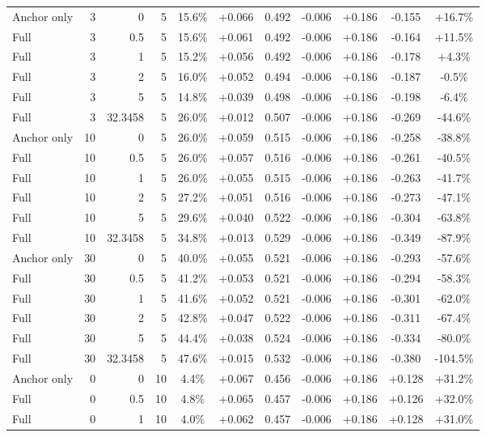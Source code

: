 \begin{table}[htbp]
\begin{tabular}{lrrrccccccc}
Anchor only & 3 & 0 & 5 & 15.6\% & +0.066 & 0.492 & -0.006 & +0.186 & -0.155 & +16.7\% \\
Full & 3 & 0.5 & 5 & 15.6\% & +0.061 & 0.492 & -0.006 & +0.186 & -0.164 & +11.5\% \\
Full & 3 & 1 & 5 & 15.2\% & +0.056 & 0.492 & -0.006 & +0.186 & -0.178 & +4.3\% \\
Full & 3 & 2 & 5 & 16.0\% & +0.052 & 0.494 & -0.006 & +0.186 & -0.187 & -0.5\% \\
Full & 3 & 5 & 5 & 14.8\% & +0.039 & 0.498 & -0.006 & +0.186 & -0.198 & -6.4\% \\
Full & 3 & 32.3458 & 5 & 26.0\% & +0.012 & 0.507 & -0.006 & +0.186 & -0.269 & -44.6\% \\
Anchor only & 10 & 0 & 5 & 26.0\% & +0.059 & 0.515 & -0.006 & +0.186 & -0.258 & -38.8\% \\
Full & 10 & 0.5 & 5 & 26.0\% & +0.057 & 0.516 & -0.006 & +0.186 & -0.261 & -40.5\% \\
Full & 10 & 1 & 5 & 26.0\% & +0.055 & 0.515 & -0.006 & +0.186 & -0.263 & -41.7\% \\
Full & 10 & 2 & 5 & 27.2\% & +0.051 & 0.516 & -0.006 & +0.186 & -0.273 & -47.1\% \\
Full & 10 & 5 & 5 & 29.6\% & +0.040 & 0.522 & -0.006 & +0.186 & -0.304 & -63.8\% \\
Full & 10 & 32.3458 & 5 & 34.8\% & +0.013 & 0.529 & -0.006 & +0.186 & -0.349 & -87.9\% \\
Anchor only & 30 & 0 & 5 & 40.0\% & +0.055 & 0.521 & -0.006 & +0.186 & -0.293 & -57.6\% \\
Full & 30 & 0.5 & 5 & 41.2\% & +0.053 & 0.521 & -0.006 & +0.186 & -0.294 & -58.3\% \\
Full & 30 & 1 & 5 & 41.6\% & +0.052 & 0.521 & -0.006 & +0.186 & -0.301 & -62.0\% \\
Full & 30 & 2 & 5 & 42.8\% & +0.047 & 0.522 & -0.006 & +0.186 & -0.311 & -67.4\% \\
Full & 30 & 5 & 5 & 44.4\% & +0.038 & 0.524 & -0.006 & +0.186 & -0.334 & -80.0\% \\
Full & 30 & 32.3458 & 5 & 47.6\% & +0.015 & 0.532 & -0.006 & +0.186 & -0.380 & -104.5\% \\
Anchor only & 0 & 0 & 10 & 4.4\% & +0.067 & 0.456 & -0.006 & +0.186 & +0.128 & +31.2\% \\
Full & 0 & 0.5 & 10 & 4.8\% & +0.065 & 0.457 & -0.006 & +0.186 & +0.126 & +32.0\% \\
Full & 0 & 1 & 10 & 4.0\% & +0.062 & 0.457 & -0.006 & +0.186 & +0.128 & +31.0\% \\

\end{tabular}
\end{table}
